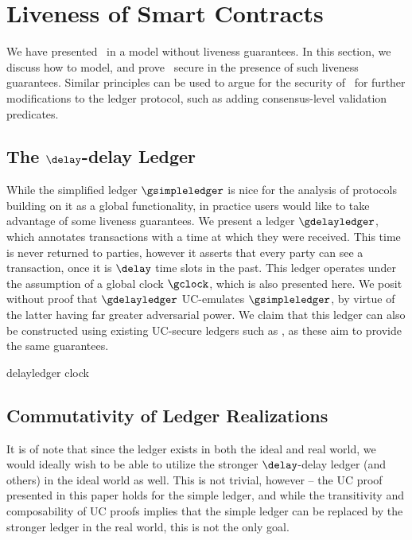 \section{Liveness of Smart Contracts}
\label{sec:liveness}

We have presented \kachina\ in a model without liveness guarantees. In this
section, we discuss how to model, and prove \kachina\ secure in the presence of
such liveness guarantees. Similar principles can be used to argue for the
security of \kachina\ for further modifications to the ledger protocol, such as
adding consensus-level validation predicates.

\subsection{The $\delay$-delay Ledger}

While the simplified ledger $\gsimpleledger$ is nice for the analysis of
protocols building on it as a global functionality, in practice users would like
to take advantage of some liveness guarantees. We present a ledger
$\gdelayledger$, which annotates transactions with a time at which they were
received. This time is never returned to parties, however it asserts that every
party can see a transaction, once it is $\delay$ time slots in the past. This
ledger operates under the assumption of a global clock $\gclock$, which is also
presented here. We posit without proof that $\gdelayledger$ UC-emulates
$\gsimpleledger$, by virtue of the latter having far greater adversarial power.
We claim that this ledger can also be constructed using existing UC-secure ledgers
such as \cite{C:BMTZ17,CCS:BGKRZ18}, as these aim to provide the same
guarantees.

{delayledger}
{clock}

\subsection{Commutativity of Ledger Realizations}
\label{sec:commuc}

It is of note that since the ledger exists in both the ideal and real world, we
would ideally wish to be able to utilize the stronger $\delay$-delay ledger (and
others) in the ideal world as well. This is not trivial, however -- the UC proof
presented in this paper holds for the simple ledger, and while the transitivity
and composability of UC proofs implies that the simple ledger can be replaced by
the stronger ledger in the real world, this is not the only goal.

